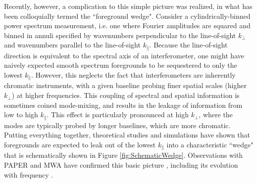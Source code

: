 \documentclass[twocolumn,aps,prd,nofootinbib,showpacs]{revtex4-1}
\begin{document}
Recently, however, a complication to this simple picture was realized, in what has been colloquially termed the ``foreground wedge".  Consider a cylindrically-binned power spectrum measurement, i.e. one where Fourier amplitudes are squared and binned in annuli specified by wavenumbers perpendicular to the line-of-sight $k_\perp$ and wavenumbers parallel to the line-of-sight $k_\parallel$.  Because the line-of-sight direction is equivalent to the spectral axis of an interferometer, one might have naively expected smooth spectrum foregrounds to be sequestered to only the lowest $k_\parallel$.  However, this neglects the fact that interferometers are inherently chromatic instruments, with a given baseline probing finer spatial scales (higher $k_\perp$) at higher frequencies.  This coupling of spectral and spatial information is sometimes coined mode-mixing, and results in  the leakage of information from low to high $k_\parallel$.  This effect is particularly pronounced at high $k_\perp$, where the modes are typically probed by longer baselines, which are more chromatic.  Putting everything together, theoretical studies and simulations \cite{Datta2010,Vedantham2012,Morales2012,Parsons2012b,Trott2012,Thyagarajan2013,Hazelton2013} have shown that foregrounds are expected to leak out of the lowest $k_\parallel$ into a characteristic ``wedge" that is schematically shown in Figure \ref{fig:SchematicWedge}.  Observations with PAPER and MWA have confirmed this basic picture \cite{Pober2013}, including its evolution with frequency \cite{Dillon2014}.
\end{document}
